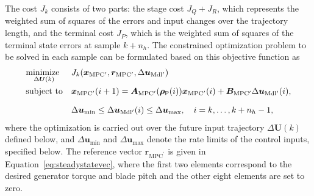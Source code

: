 The cost \( J_k \) consists of two parts: the stage cost $J_Q + J_R$, which represents the weighted sum of squares of the errors and input changes over the trajectory length, and the terminal cost $J_P$, which is the weighted sum of squares of the terminal state errors at sample $k+n_h$.
The constrained optimization problem to be solved in each sample can be formulated based on this objective function as
\begin{align} \label{eq:ObjFunWT}
    \begin{array}{ll}
        \underset{\Delta \bm{U}(k)}{\text{minimize }} & J_k(\bm{x}_{\text{MPC}^\prime}, \bm{r}_{\text{MPC}^\prime}, \Delta \bm{u}_{\text{Mdl}^\prime}) \\[10pt]
        \text{subject to} & \bm{x}_{\text{MPC}^\prime}(i+1) = \bm{A}_{\text{MPC}^\prime}(\bm{\rho}_{\mathsf{P}}(i)) \bm{x}_{\text{MPC}^\prime}(i) + \bm{B}_{\text{MPC}^\prime} \Delta \bm{u}_{\text{Mdl}^\prime}(i), \\[10pt]
        & \Delta\bm{u}_{\text{min}} \leq \Delta \bm{u}_{\text{Mdl}^\prime}(i) \leq \Delta\bm{u}_{\text{max}}, \quad i = k, \dots, k+n_h-1,
    \end{array}
\end{align}
where the optimization is carried out over the future input trajectory $\Delta\bm{U}(k)$ defined below, and $\Delta\bm{u}_{\text{min}}$ and $\Delta\bm{u}_{\text{max}}$ denote the rate limits of the control inputs, specified below. The reference vector $\bm{r}_{\text{MPC}^\prime}$ is given in Equation~\eqref{eq:steadystatevec}, where the first two elements correspond to the desired generator torque and blade pitch and the other eight elements are set to zero.

